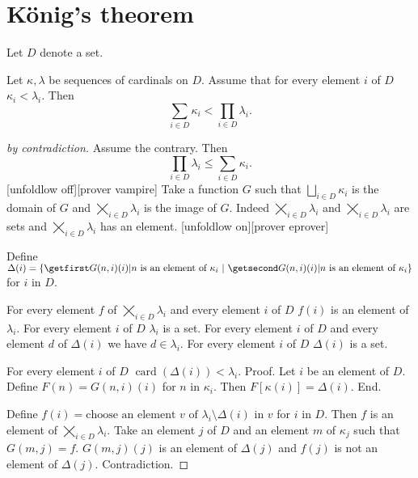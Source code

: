 \documentclass{article}
\newcommand{\card}[1]{\operatorname{card}(#1)}
\newcommand{\SumSet}[2]{\bigsqcup_{i \in #2} #1_{i}}
\newcommand{\Sum}[2]{\sum_{i \in #2} #1_{i}}
\newcommand{\ProdSet}[2]{\bigtimes_{i \in #2} #1_{i}}
\newcommand{\Prod}[2]{\prod_{i \in #2} #1_{i}}
\begin{document}
\section{König's theorem}

\begin{forthel}
  Let $D$ denote a set.

  \begin{theorem}
    Let $\kappa, \lambda$ be sequences of cardinals on $D$.
    Assume that for every element $i$ of $D$ $\kappa_{i} < \lambda_{i}$.
    Then \[ \Sum{\kappa}{D} < \Prod{\lambda}{D}. \]
  \end{theorem}
  \begin{proof}[by contradiction]
    Assume the contrary.
    Then \[ \Prod{\lambda}{D} \leq \Sum{\kappa}{D}. \]
    [unfoldlow off][prover vampire]
    Take a function $G$ such that $\SumSet{\kappa}{D}$ is the domain of $G$ and
    $\ProdSet{\lambda}{D}$ is the image of $G$.
    Indeed $\ProdSet{\lambda}{D}$ and $\ProdSet{\lambda}{D}$ are sets and
    $\ProdSet{\lambda}{D}$ has an element.
    [unfoldlow on][prover eprover]

    Define $\Delta(i) = \class{G(n,i)(i) | \text{$n$ is an element of
    $\kappa_{i}$}}$ for $i$ in $D$.

    For every element $f$ of $\ProdSet{\lambda}{D}$ and every element $i$ of $D$
    $f(i)$ is an element of $\lambda_{i}$.
    For every element $i$ of $D$ $\lambda_{i}$ is a set.
    For every element $i$ of $D$ and every element $d$ of $\Delta(i)$ we have
    $d\in \lambda_{i}$.
    For every element $i$ of $D$ $\Delta(i)$ is a set.

    For every element $i$ of $D$ $\card{\Delta(i)} < \lambda_{i}$. \newline
    Proof.
      Let $i$ be an element of $D$.
      Define $F(n) = G(n,i)(i)$ for $n$ in $\kappa_{i}$.
      Then $F[\kappa(i)] = \Delta(i)$.
    End.

    Define $f(i) = \text{choose an element $v$ of $\lambda_{i} \setminus
    \Delta(i)$ in $v$}$ for $i$ in $D$.
    Then $f$ is an element of $\ProdSet{\lambda}{D}$.
    Take an element $j$ of $D$ and an element $m$ of $\kappa_{j}$ such that
    $G(m,j) = f$.
    $G(m,j)(j)$ is an element of $\Delta(j)$ and $f(j)$ is not an element of
    $\Delta(j)$.
    Contradiction.
  \end{proof}
\end{forthel}

\printbibliography
\end{document}
